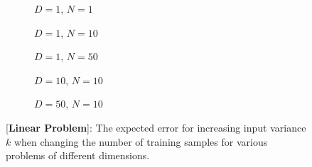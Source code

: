 \begin{figure}[!h]
  \centering
    \begin{subfigure}{0.3\textwidth}
      \centering
      \caption{$D=1$, $N=1$}
      \label{fig:linear-b-N-1-D-1}
    \end{subfigure}
    \begin{subfigure}{0.3\textwidth}
      \centering
      \caption{$D=1$, $N=10$}
      \label{fig:linear-b-N-10-D-1}
    \end{subfigure}
    \begin{subfigure}{0.3\textwidth}
      \centering
      \caption{$D=1$, $N=50$}
      \label{fig:linear-b-N-50-D-1}
    \end{subfigure}

    \begin{subfigure}{0.3\textwidth}
      \centering
      \caption{$D=10$, $N=10$}
      \label{fig:linear-b-N-10-D-10}
    \end{subfigure}
    \begin{subfigure}{0.3\textwidth}
      \centering
      \caption{$D=50$, $N=10$}
      \label{fig:linear-b-N-10-D-50}
    \end{subfigure}  

  \caption{[\textbf{Linear Problem}]: The expected error for increasing input variance $k$  when changing the number of training samples for various problems of different dimensions.}
  \label{fig:linear-b}
\end{figure}



